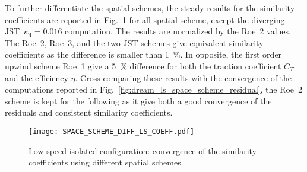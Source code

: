 To further differentiate the spatial schemes, 
the steady results for the similarity coefficients are reported
in Fig.~\ref{fig:dream_ls_space_scheme_coeff} for all spatial scheme, 
except the diverging JST~$\kappa_4 = 0.016$ computation.
The results are normalized by the Roe~2 values.
The Roe~2, Roe~3, and the two JST schemes give equivalent
similarity coefficients as the difference is smaller than 1~\%.
In opposite, the first order upwind scheme Roe~1 give a 5~\%
difference for both the traction coefficient $C_T$ and the efficiency $\eta$.
Cross-comparing these results with the convergence of the computations
reported in Fig.~\ref{fig:dream_ls_space_scheme_residual}, the Roe~2
scheme is kept for the following as it give both a good convergence
of the residuals and consistent similarity coefficients.
\begin{figure}[htp]
  \centering
  \texttt{[image: SPACE\_SCHEME\_DIFF\_LS\_COEFF.pdf]}
  \caption{Low-speed isolated configuration: convergence of the 
  similarity coefficients using different spatial schemes.}
  \label{fig:dream_ls_space_scheme_coeff}
\end{figure}
